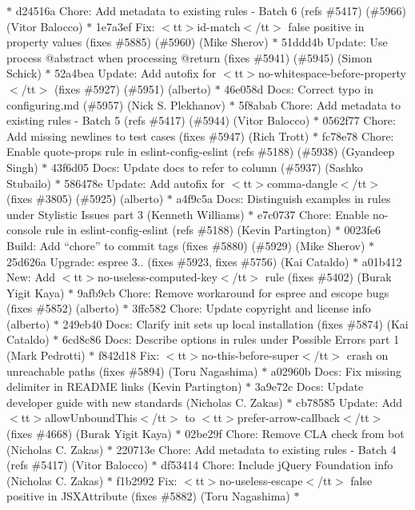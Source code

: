 \begin{DoxyItemize}
\texorpdfstring{$\ast$}{*} d24516a Chore\+: Add metadata to existing rules -\/ Batch 6 (refs \#5417) (\#5966) (\+Vitor Balocco) \texorpdfstring{$\ast$}{*} 1e7a3ef Fix\+: $<$tt$>$id-\/match$<$/tt$>$ false positive in property values (fixes \#5885) (\#5960) (\+Mike Sherov) \texorpdfstring{$\ast$}{*} 51ddd4b Update\+: Use process @abstract when processing @return (fixes \#5941) (\#5945) (\+Simon Schick) \texorpdfstring{$\ast$}{*} 52a4bea Update\+: Add autofix for $<$tt$>$no-\/whitespace-\/before-\/property$<$/tt$>$ (fixes \#5927) (\#5951) (alberto) \texorpdfstring{$\ast$}{*} 46e058d Docs\+: Correct typo in configuring.\+md (\#5957) (\+Nick S. Plekhanov) \texorpdfstring{$\ast$}{*} 5f8abab Chore\+: Add metadata to existing rules -\/ Batch 5 (refs \#5417) (\#5944) (\+Vitor Balocco) \texorpdfstring{$\ast$}{*} 0562f77 Chore\+: Add missing newlines to test cases (fixes \#5947) (\+Rich Trott) \texorpdfstring{$\ast$}{*} fc78e78 Chore\+: Enable quote-\/props rule in eslint-\/config-\/eslint (refs \#5188) (\#5938) (\+Gyandeep Singh) \texorpdfstring{$\ast$}{*} 43f6d05 Docs\+: Update docs to refer to column (\#5937) (\+Sashko Stubailo) \texorpdfstring{$\ast$}{*} 586478e Update\+: Add autofix for $<$tt$>$comma-\/dangle$<$/tt$>$ (fixes \#3805) (\#5925) (alberto) \texorpdfstring{$\ast$}{*} a4f9c5a Docs\+: Distinguish examples in rules under Stylistic Issues part 3 (\+Kenneth Williams) \texorpdfstring{$\ast$}{*} e7c0737 Chore\+: Enable no-\/console rule in eslint-\/config-\/eslint (refs \#5188) (\+Kevin Partington) \texorpdfstring{$\ast$}{*} 0023fe6 Build\+: Add “chore” to commit tags (fixes \#5880) (\#5929) (\+Mike Sherov) \texorpdfstring{$\ast$}{*} 25d626a Upgrade\+: espree 3.. (fixes \#5923, fixes \#5756) (\+Kai Cataldo) \texorpdfstring{$\ast$}{*} a01b412 New\+: Add $<$tt$>$no-\/useless-\/computed-\/key$<$/tt$>$ rule (fixes \#5402) (\+Burak Yigit Kaya) \texorpdfstring{$\ast$}{*} 9afb9cb Chore\+: Remove workaround for espree and escope bugs (fixes \#5852) (alberto) \texorpdfstring{$\ast$}{*} 3ffc582 Chore\+: Update copyright and license info (alberto) \texorpdfstring{$\ast$}{*} 249eb40 Docs\+: Clarify init sets up local installation (fixes \#5874) (\+Kai Cataldo) \texorpdfstring{$\ast$}{*} 6cd8c86 Docs\+: Describe options in rules under Possible Errors part 1 (\+Mark Pedrotti) \texorpdfstring{$\ast$}{*} f842d18 Fix\+: $<$tt$>$no-\/this-\/before-\/super$<$/tt$>$ crash on unreachable paths (fixes \#5894) (\+Toru Nagashima) \texorpdfstring{$\ast$}{*} a02960b Docs\+: Fix missing delimiter in README links (\+Kevin Partington) \texorpdfstring{$\ast$}{*} 3a9e72c Docs\+: Update developer guide with new standards (\+Nicholas C. Zakas) \texorpdfstring{$\ast$}{*} cb78585 Update\+: Add $<$tt$>$allow\+Unbound\+This$<$/tt$>$ to $<$tt$>$prefer-\/arrow-\/callback$<$/tt$>$ (fixes \#4668) (\+Burak Yigit Kaya) \texorpdfstring{$\ast$}{*} 02be29f Chore\+: Remove CLA check from bot (\+Nicholas C. Zakas) \texorpdfstring{$\ast$}{*} 220713e Chore\+: Add metadata to existing rules -\/ Batch 4 (refs \#5417) (\+Vitor Balocco) \texorpdfstring{$\ast$}{*} df53414 Chore\+: Include j\+Query Foundation info (\+Nicholas C. Zakas) \texorpdfstring{$\ast$}{*} f1b2992 Fix\+: $<$tt$>$no-\/useless-\/escape$<$/tt$>$ false positive in JSXAttribute (fixes \#5882) (\+Toru Nagashima) \texorpdfstring{$\ast$}{*} 
\end{DoxyItemize}
